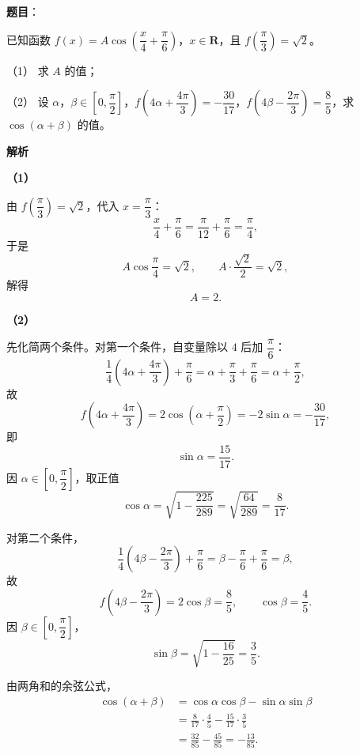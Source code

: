\begin{answer}

\textbf{题目}：

已知函数 $f(x)=A\cos\left(\dfrac x4+\dfrac\pi6\right)$，$x\in\mathbf R$，且 $f\left(\dfrac\pi3\right)=\sqrt2$。

（1） 求 $A$ 的值；

（2） 设 $\alpha$，$\beta\in\left[0,\dfrac\pi2\right]$，$f\left(4\alpha+\dfrac{4\pi}{3}\right)=-\dfrac{30}{17}$，$f\left(4\beta-\dfrac{2\pi}{3}\right)=\dfrac85$，求 $\cos(\alpha+\beta)$ 的值。

\textbf{解析}

\textbf{（1）}

由 $f\left(\dfrac\pi3\right)=\sqrt2$，代入 $x=\dfrac\pi3$：
\nopagebreak[4]
\[\frac x4+\frac\pi6=\frac\pi{12}+\frac{\pi}{6}=\frac{\pi}{4},\]
于是
\nopagebreak[4]
\[A\cos\frac\pi4=\sqrt2,\qquad A\cdot\frac{\sqrt2}{2}=\sqrt2,\]
解得
\nopagebreak[4]
\[A=2.\]

\textbf{（2）}

先化简两个条件。对第一个条件，自变量除以 $4$ 后加 $\dfrac\pi6$：
\nopagebreak[4]
\[\frac14\left(4\alpha+\frac{4\pi}{3}\right)+\frac\pi6=\alpha+\frac\pi3+\frac\pi6=\alpha+\frac\pi2,\]
故
\nopagebreak[4]
\[f\left(4\alpha+\frac{4\pi}{3}\right)=2\cos\left(\alpha+\frac\pi2\right)=-2\sin\alpha=-\frac{30}{17},\]
即
\nopagebreak[4]
\[\sin\alpha=\frac{15}{17}.\]
因 $\alpha\in\left[0,\dfrac\pi2\right]$，取正值
\nopagebreak[4]
\[\cos\alpha=\sqrt{1-\frac{225}{289}}=\sqrt{\frac{64}{289}}=\frac8{17}.\]

对第二个条件，
\nopagebreak[4]
\[\frac14\left(4\beta-\frac{2\pi}{3}\right)+\frac\pi6=\beta-\frac\pi6+\frac\pi6=\beta,\]
故
\nopagebreak[4]
\[f\left(4\beta-\frac{2\pi}{3}\right)=2\cos\beta=\frac85,\qquad \cos\beta=\frac45.\]
因 $\beta\in\left[0,\dfrac\pi2\right]$，
\nopagebreak[4]
\[\sin\beta=\sqrt{1-\frac{16}{25}}=\frac35.\]

由两角和的余弦公式，
\nopagebreak[4]
\[\begin{aligned}
\cos(\alpha+\beta)&=\cos\alpha\cos\beta-\sin\alpha\sin\beta\\
&=\frac8{17}\cdot\frac45-\frac{15}{17}\cdot\frac35\\
&=\frac{32}{85}-\frac{45}{85}=-\frac{13}{85}.
\end{aligned}\]



\end{answer}
